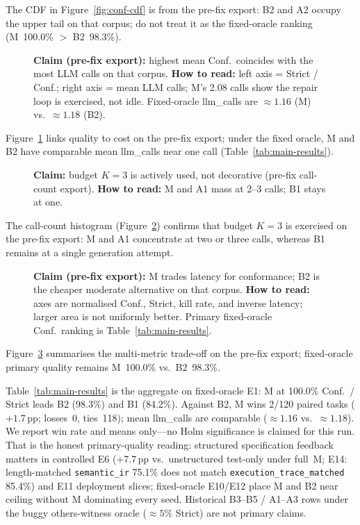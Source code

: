 The CDF in Figure~\ref{fig:conf-cdf} is from the pre-fix export: B2 and A2
occupy the upper tail on that corpus; do not treat it as the fixed-oracle
ranking (M~100.0\% $>$ B2~98.3\%).

\begin{figure}[t]
  \centering
  \caption{\textbf{Claim (pre-fix export):} highest mean Conf.\ coincides with
    the most LLM calls on that corpus.
    \textbf{How to read:} left axis = Strict / Conf.; right axis = mean LLM
    calls; M's 2.08 calls show the repair loop is exercised, not idle.
    Fixed-oracle llm\_calls are ${\approx}1.16$ (M) vs.\ ${\approx}1.18$ (B2).}
  \label{fig:summary-metrics}
\end{figure}

Figure~\ref{fig:summary-metrics} links quality to cost on the pre-fix
export; under the fixed oracle, M and B2 have comparable mean llm\_calls
near one call (Table~\ref{tab:main-results}).

\begin{figure}[t]
  \centering
  \caption{\textbf{Claim:} budget $K=3$ is actively used, not decorative
    (pre-fix call-count export).
    \textbf{How to read:} M and A1 mass at 2--3 calls; B1 stays at one.}
  \label{fig:llm-calls}
\end{figure}

The call-count histogram (Figure~\ref{fig:llm-calls}) confirms that budget
$K{=}3$ is exercised on the pre-fix export: M and A1 concentrate at two or
three calls, whereas B1 remains at a single generation attempt.

\begin{figure}[t]
  \centering
  \caption{\textbf{Claim (pre-fix export):} M trades latency for conformance;
    B2 is the cheaper moderate alternative on that corpus.
    \textbf{How to read:} axes are normalised Conf., Strict, kill rate, and
    inverse latency; larger area is not uniformly better.
    Primary fixed-oracle Conf.\ ranking is Table~\ref{tab:main-results}.}
  \label{fig:radar-metrics}
\end{figure}

Figure~\ref{fig:radar-metrics} summarises the multi-metric trade-off on the
pre-fix export; fixed-oracle primary quality remains M~100.0\% vs.\ B2~98.3\%.

Table~\ref{tab:main-results} is the aggregate on fixed-oracle E1: M at
100.0\% Conf.\ / Strict leads B2 (98.3\%) and B1 (84.2\%).
Against B2, M wins 2/120 paired tasks (${+}1.7$\,pp; losses~0, ties~118);
mean llm\_calls are comparable (${\approx}1.16$ vs.\ ${\approx}1.18$).
We report win rate and means only---no Holm significance is claimed for this
run.
That is the honest primary-quality reading: structured specification feedback
matters in controlled E6 (+7.7\,pp vs.\ unstructured test-only under full~M;
E14: length-matched \texttt{semantic\_ir} 75.1\% does not match
\texttt{execution\_trace\_matched} 85.4\%) and E11 deployment slices;
fixed-oracle E10/E12 place M and B2 near ceiling without M dominating every
seed.
Historical B3--B5 / A1--A3 rows under the buggy others-witness oracle
(${\approx}5\%$ Strict) are not primary claims.

